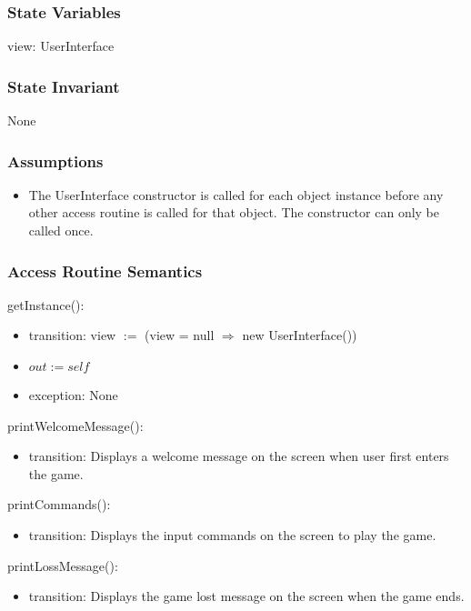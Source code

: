 \documentclass[12pt]{article}
\begin{document}
\subsubsection* {State Variables}
view: UserInterface

\subsubsection* {State Invariant}
None

\subsubsection* {Assumptions}
\begin{itemize}
  \item The UserInterface constructor is called for each object instance before any other access routine is called for that object. The constructor can only be called once.
\end{itemize}

\subsubsection* {Access Routine Semantics}
getInstance():
\begin{itemize}
    \item transition: view $:=$ (view = null $\Rightarrow$ new UserInterface())
    \item $out := \mathit{self}$
    \item exception: None
\end{itemize}

\noindent printWelcomeMessage():
\begin{itemize}
    \item transition: Displays a welcome message on the screen when user first enters the game.
\end{itemize}

\noindent printCommands():
\begin{itemize}
    \item transition: Displays the input commands on the screen to play the game.
\end{itemize}

\noindent printLossMessage():
\begin{itemize}
    \item transition: Displays the game lost message on the screen when the game ends.
\end{itemize}
\end{document}
